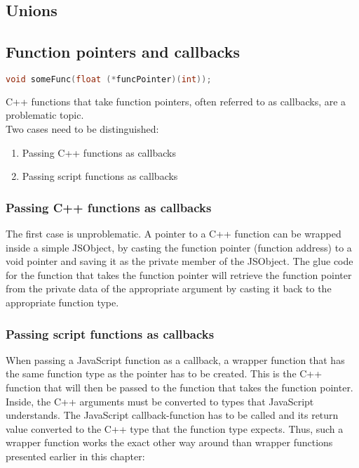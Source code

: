 \subsection{Unions}

\subsection{Function pointers and callbacks}

\begin{lstlisting}[language=C++, caption=C++ function that takes a function pointer]
void someFunc(float (*funcPointer)(int));
\end{lstlisting}

C++ functions that take function pointers, often referred to as callbacks, are a problematic topic.\\
Two cases need to be distinguished:
\begin{enumerate}
\item Passing C++ functions as callbacks
\item Passing script functions as callbacks
\end{enumerate}

\subsubsection{Passing C++ functions as callbacks}

The first case is unproblematic. A pointer to a C++ function can be wrapped inside a simple JSObject, by casting the function pointer (function address) to a void pointer and saving it as the private member of the JSObject. The glue code for the function that takes the function pointer will retrieve the function pointer from the private data of the appropriate argument by casting it back to the appropriate function type.

\subsubsection{Passing script functions as callbacks}

When passing a JavaScript function as a callback, a wrapper function that has the same function type as the pointer has to be created. This is the C++ function that will then be passed to the function that takes the function pointer. Inside, the C++ arguments must be converted to types that JavaScript understands. The JavaScript callback-function has to be called and its return value converted to the C++ type that the function type expects. Thus, such a wrapper function works the exact other way around than wrapper functions presented earlier in this chapter:

